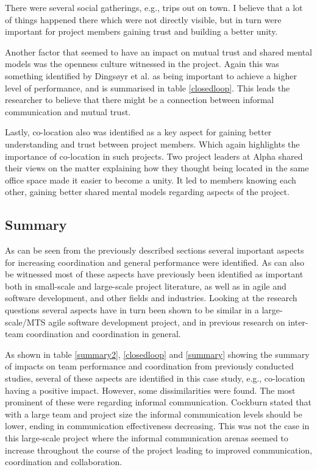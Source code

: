 \begin{fancyquotes}
There were several social gatherings, e.g., trips out on town. I believe that a lot of things happened there which were not directly visible, but in turn were important for project members gaining trust and building a better unity.
\end{fancyquotes}

Another factor that seemed to have an impact on mutual trust and shared mental models was the openness culture witnessed in the project. Again this was something identified by Dingsøyr et al. \cite{Dingsoyr2013c} as being important to achieve a higher level of performance, and is summarised in table \ref{closedloop}. This leads the researcher to believe that there might be a connection between informal communication and mutual trust.

Lastly, co-location also was identified as a key aspect for gaining better understanding and trust between project members. Which again highlights the importance of co-location in such projects. Two project leaders at Alpha shared their views on the matter explaining how they thought being located in the same office space made it easier to become a unity. It led to members knowing each other, gaining better shared mental models regarding aspects of the project.

\subsection{Summary}

As can be seen from the previously described sections several important aspects for increasing coordination and general performance were identified. As can also be witnessed most of these aspects have previously been identified as important both in small-scale and large-scale project literature, as well as in agile and software development, and other fields and industries. Looking at the research questions several aspects have in turn been shown to be similar in a large-scale/MTS agile software development project, and in previous research on inter-team coordination and coordination in general.

As shown in table \ref{summary2}, \ref{closedloop} and \ref{summary} showing the summary of impacts on team performance and coordination from previously conducted studies, several of these aspects are identified in this case study, e.g., co-location having a positive impact. However, some dissimilarities were found. The most prominent of these were regarding informal communication. Cockburn \cite{Cockburn2000} stated that with a large team and project size the informal communication levels should be lower, ending in communication effectiveness decreasing. This was not the case in this large-scale project where the informal communication arenas seemed to increase throughout the course of the project leading to improved communication, coordination and collaboration.

